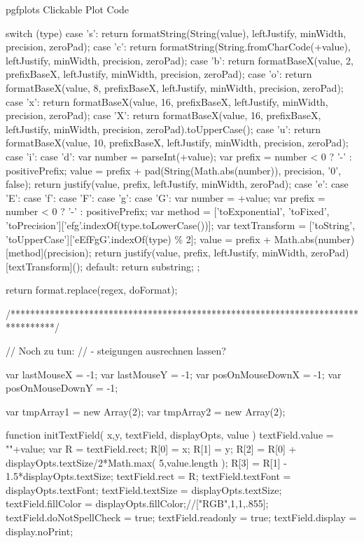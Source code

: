 \begin{insDLJS}[processAnnotatedPlot]{\jobname}{pgfplots Clickable Plot Code}
{{        switch (type) {
            case 's': return formatString(String(value), leftJustify, minWidth, precision, zeroPad);
            case 'c': return formatString(String.fromCharCode(+value), leftJustify, minWidth, precision, zeroPad);
            case 'b': return formatBaseX(value, 2, prefixBaseX, leftJustify, minWidth, precision, zeroPad);
            case 'o': return formatBaseX(value, 8, prefixBaseX, leftJustify, minWidth, precision, zeroPad);
            case 'x': return formatBaseX(value, 16, prefixBaseX, leftJustify, minWidth, precision, zeroPad);
            case 'X': return formatBaseX(value, 16, prefixBaseX, leftJustify, minWidth, precision, zeroPad).toUpperCase();
            case 'u': return formatBaseX(value, 10, prefixBaseX, leftJustify, minWidth, precision, zeroPad);
            case 'i':
            case 'd': {
                        var number = parseInt(+value);
                        var prefix = number < 0 ? '-' : positivePrefix;
                        value = prefix + pad(String(Math.abs(number)), precision, '0', false);
                        return justify(value, prefix, leftJustify, minWidth, zeroPad);
                    }
            case 'e':
            case 'E':
            case 'f':
            case 'F':
            case 'g':
            case 'G':
                        {
                        var number = +value;
                        var prefix = number < 0 ? '-' : positivePrefix;
                        var method = ['toExponential', 'toFixed', 'toPrecision']['efg'.indexOf(type.toLowerCase())];
                        var textTransform = ['toString', 'toUpperCase']['eEfFgG'.indexOf(type) \% 2];
                        value = prefix + Math.abs(number)[method](precision);
                        return justify(value, prefix, leftJustify, minWidth, zeroPad)[textTransform]();
                    }
            default: return substring;
        }
    };

    return format.replace(regex, doFormat);
}
/*********************************************************************************/


// Noch zu tun:
// - steigungen ausrechnen lassen?

var lastMouseX = -1;
var lastMouseY = -1;
var posOnMouseDownX = -1;
var posOnMouseDownY = -1;

var tmpArray1 = new Array(2);
var tmpArray2 = new Array(2);

function initTextField( x,y, textField, displayOpts, value )
{
	textField.value = ""+value;
	var R = textField.rect;
	R[0] = x;
	R[1] = y;
	R[2] = R[0] + displayOpts.textSize/2*Math.max( 5,value.length );
	R[3] = R[1] - 1.5*displayOpts.textSize;
	textField.rect = R;
	textField.textFont = displayOpts.textFont;
	textField.textSize = displayOpts.textSize;
	textField.fillColor = displayOpts.fillColor;//["RGB",1,1,.855];
	textField.doNotSpellCheck = true;
	textField.readonly = true;
	textField.display = display.noPrint;
}


\end{insDLJS}
